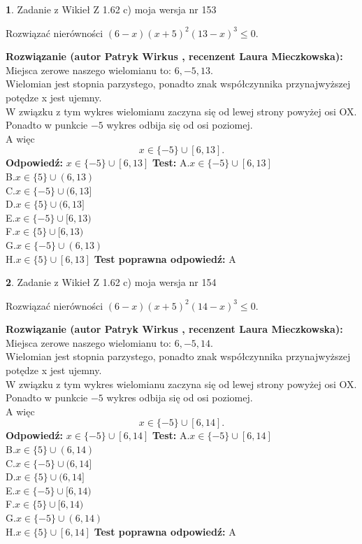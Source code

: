 \documentclass[12pt, a4paper]{article}
\theoremstyle{definition} %
\newtheorem{zad}{}
\newcommand{\zadStart}[1]{\begin{zad}#1\newline}
\newcommand{\zadStop}{\end{zad}}
\newcommand{\rozwStart}[2]{\noindent \textbf{Rozwiązanie (autor #1 , recenzent #2): }\newline}
\newcommand{\rozwStop}{\newline}
\newcommand{\odpStart}{\noindent \textbf{Odpowiedź:}\newline}
\newcommand{\odpStop}{\newline}
\newcommand{\testStart}{\noindent \textbf{Test:}\newline}
\newcommand{\testStop}{\newline}
\newcommand{\kluczStart}{\noindent \textbf{Test poprawna odpowiedź:}\newline}
\newcommand{\kluczStop}{\newline}
\begin{document}
\zadStart{Zadanie z Wikieł Z 1.62 c) moja wersja nr 153}

Rozwiązać nierówności $(6-x)(x+5)^{2}(13-x)^{3}\le0$.
\zadStop
\rozwStart{Patryk Wirkus}{Laura Mieczkowska}
Miejsca zerowe naszego wielomianu to: $6, -5, 13$.\\
Wielomian jest stopnia parzystego, ponadto znak współczynnika przy\linebreak najwyższej potędze x jest ujemny.\\ W związku z tym wykres wielomianu zaczyna się od lewej strony powyżej osi OX.\\
Ponadto w punkcie $-5$ wykres odbija się od osi poziomej.\\
A więc $$x \in \{-5\} \cup [6,13].$$
\rozwStop
\odpStart
$x \in \{-5\} \cup [6,13]$
\odpStop
\testStart
A.$x \in \{-5\} \cup [6,13]$\\
B.$x \in \{5\} \cup (6,13)$\\
C.$x \in \{-5\} \cup (6,13]$\\
D.$x \in \{5\} \cup (6,13]$\\
E.$x \in \{-5\} \cup [6,13)$\\
F.$x \in \{5\} \cup [6,13)$\\
G.$x \in \{-5\} \cup (6,13)$\\
H.$x \in \{5\} \cup [6,13]$
\testStop
\kluczStart
A
\kluczStop



\zadStart{Zadanie z Wikieł Z 1.62 c) moja wersja nr 154}

Rozwiązać nierówności $(6-x)(x+5)^{2}(14-x)^{3}\le0$.
\zadStop
\rozwStart{Patryk Wirkus}{Laura Mieczkowska}
Miejsca zerowe naszego wielomianu to: $6, -5, 14$.\\
Wielomian jest stopnia parzystego, ponadto znak współczynnika przy\linebreak najwyższej potędze x jest ujemny.\\ W związku z tym wykres wielomianu zaczyna się od lewej strony powyżej osi OX.\\
Ponadto w punkcie $-5$ wykres odbija się od osi poziomej.\\
A więc $$x \in \{-5\} \cup [6,14].$$
\rozwStop
\odpStart
$x \in \{-5\} \cup [6,14]$
\odpStop
\testStart
A.$x \in \{-5\} \cup [6,14]$\\
B.$x \in \{5\} \cup (6,14)$\\
C.$x \in \{-5\} \cup (6,14]$\\
D.$x \in \{5\} \cup (6,14]$\\
E.$x \in \{-5\} \cup [6,14)$\\
F.$x \in \{5\} \cup [6,14)$\\
G.$x \in \{-5\} \cup (6,14)$\\
H.$x \in \{5\} \cup [6,14]$
\testStop
\kluczStart
A
\kluczStop
\end{document}
